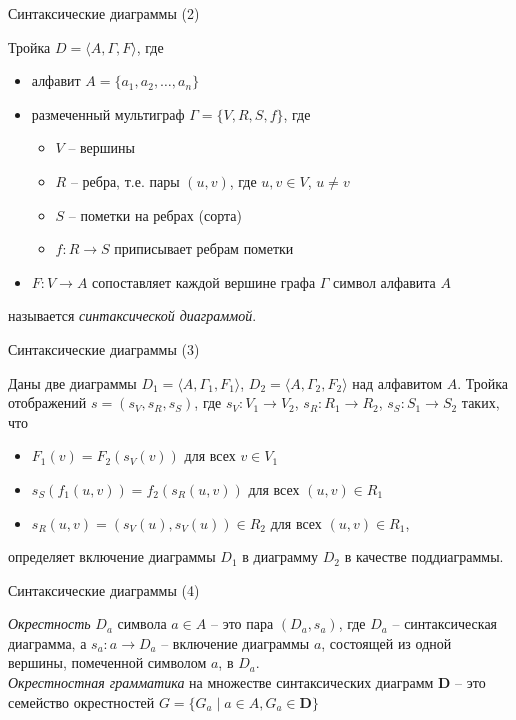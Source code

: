 \documentclass{beamer}
\begin{document}
\begin{frame}{Синтаксические диаграммы (2)}
\begin{small}
Тройка $D = \langle A, \Gamma, F \rangle$, где\\
\medskip
\begin{itemize}
	\item алфавит $A = \{ a_1, a_2, \dots, a_n \}$
	\item размеченный мультиграф $\Gamma = \{ V, R, S, f \}$, где 
		\begin{itemize}
			\item $V$ -- вершины
			\item $R$ -- ребра, т.е. пары $(u, v)$, где $u, v \in V$, $u \neq v$
			\item $S$ -- пометки на ребрах (сорта)
			\item $f : R \to S$ приписывает ребрам пометки
		\end{itemize}
	\item $F : V \to A$ сопоставляет каждой вершине графа $\Gamma$ символ алфавита $A$
\end{itemize}
\medskip
называется \textit{синтаксической диаграммой}.
\end{small}
\end{frame}

\begin{frame}{Синтаксические диаграммы (3)}
\begin{small}
Даны две диаграммы $D_1 = \langle A, \Gamma_1, F_1 \rangle$, $D_2 = \langle A, \Gamma_2, F_2 \rangle$ над алфавитом $A$. Тройка отображений $s = (s_V, s_R, s_S)$, где $s_V : V_1 \to V_2$, $s_R : R_1 \to R_2$, $s_S : S_1 \to S_2$ таких, что\\
\medskip
\begin{itemize}
	\item $F_1(v) = F_2(s_V(v))$ для всех $v \in V_1$
	\item $s_S(f_1(u, v)) = f_2(s_R(u, v))$ для всех $(u, v) \in R_1$
	\item $s_R(u, v) = (s_V(u), s_V(u)) \in R_2$ для всех $(u, v) \in R_1$,
\end{itemize}
\medskip
определяет включение диаграммы $D_1$ в диаграмму $D_2$ в качестве поддиаграммы.
\end{small}\end{frame}

\begin{frame}{Синтаксические диаграммы (4)}
\begin{small}
\textit{Окрестность} $D_a$ символа $a \in A$ -- это пара  $(D_a, s_a)$, где $D_a$ -- синтаксическая диаграмма, а $s_a : a \to D_a$ -- включение диаграммы $a$, состоящей из одной вершины, помеченной символом $a$, в $D_a$.\\
\bigskip
\textit{Окрестностная грамматика} на множестве синтаксических диаграмм $\mathbf{D}$ -- это семейство окрестностей $G = \{ G_a \; \vert \; a \in A, G_a \in \mathbf{D} \}$
\end{small}
\end{frame}
\end{document}
